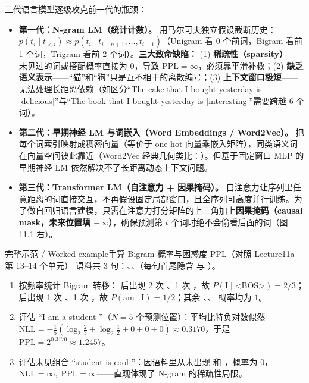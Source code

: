 三代语言模型逐级攻克前一代的瓶颈：
\begin{itemize}
\item \textbf{第一代：N-gram LM（统计计数）。} 用马尔可夫独立假设截断历史：$p(t_i\mid t_{<i}) \approx p(t_i\mid t_{i-n+1},\dots,t_{i-1})$（Unigram 看 0 个前词，Bigram 看前 1 个词，Trigram 看前 2 个词）。\textbf{三大致命缺陷：} (1) \textbf{稀疏性（sparsity）}——未见过的词或搭配概率直接为 0，导致 $\mathrm{PPL}=\infty$，必须靠平滑补救；(2) \textbf{缺乏语义表示}——“猫”和“狗”只是互不相干的离散编号；(3) \textbf{上下文窗口极短}——无法处理长距离依赖（如区分“The cake that I bought yesterday is [delicious]”与“The book that I bought yesterday is [interesting]”需要跨越 6 个词）。
\item \textbf{第二代：早期神经 LM 与词嵌入（Word Embeddings / Word2Vec）。} 把每个词索引映射成稠密向量（等价于 one-hot 向量乘嵌入矩阵），同类语义词在向量空间彼此靠近（Word2Vec 经典几何类比：）。但基于固定窗口 MLP 的早期神经 LM 依然解决不了长距离动态上下文问题。
\item \textbf{第三代：Transformer LM（自注意力 + 因果掩码）。} 自注意力让序列里任意距离的词直接交互，不再假设固定局部窗口，且全序列可高度并行训练。为了做自回归语言建模，只需在注意力打分矩阵的上三角加上\textbf{因果掩码（causal mask，未来位置填 $-\infty$）}，确保预测第 $t$ 个词时绝不会偷看后面的词（图 11.1 右）。
\end{itemize}

\begin{StudyBlock}{完整示范 / Worked example}{手算 Bigram 概率与困惑度 PPL（对照 Lecture11a 第 13–14 个单元）}
语料共 3 句：\StudyInline{["I","am","a","student"]}、、（每句首尾隐含  与 ）。
\begin{enumerate}
\item 按频率统计 Bigram 转移： 后出现 2 次 、1 次 ，故 $P(\text{I}\mid\text{<BOS>})=2/3$； 后出现 1 次 、1 次 ，故 $P(\text{am}\mid\text{I})=1/2$；其余 、、 概率均为 $1$。
\item 评估 “I am a student ”（$N=5$ 个预测位置）：平均比特负对数似然 $\mathrm{NLL} = -\frac{1}{5}(\log_2\frac{2}{3}+\log_2\frac{1}{2}+0+0+0) \approx 0.3170$，于是 $\mathrm{PPL} = 2^{0.3170} \approx 1.2457$。
\item 评估未见组合 “student is cool ”：因语料里从未出现  和 ，概率为 0，$\mathrm{NLL}=\infty,\;\mathrm{PPL}=\infty$——直观体现了 N-gram 的稀疏性局限。
\end{enumerate}
\end{StudyBlock}

